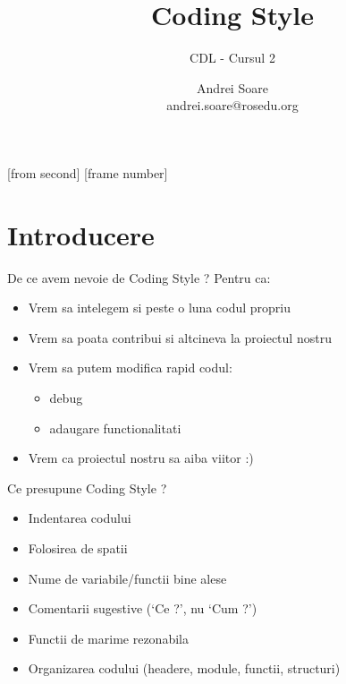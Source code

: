 \documentclass{beamer}
\title[Coding Style]{Coding Style}
\subtitle{CDL - Cursul 2}
\institute{ROSEdu}
\author{Andrei Soare \\ {\footnotesize andrei.soare@rosedu.org}}
\begin{document}
[from second]
[frame number]

\frame{\titlepage}

\frame{\tableofcontents}


\section{Introducere}

  \frame{\tableofcontents[currentsection]}

  \begin{frame}{De ce avem nevoie de Coding Style ?}
  Pentru ca:\\
  \vspace{0.8cm}
  \begin{itemize}
  \setlength{\itemsep}{0.3cm}
  \pause \item Vrem sa intelegem si peste o luna codul propriu
  \pause \item Vrem sa poata contribui si altcineva la proiectul nostru
  \pause \item Vrem sa putem modifica rapid codul:\begin{itemize} \item debug \item adaugare functionalitati \end{itemize}
  \pause \item Vrem ca proiectul nostru sa aiba viitor :)
  \end{itemize}
  \end{frame}

  \begin{frame}{Ce presupune Coding Style ?}
  \begin{itemize}
  \setlength{\itemsep}{0.3cm}
  \item Indentarea codului \pause
  \item Folosirea de spatii \pause
  \item Nume de variabile/functii bine alese \pause
  \item Comentarii sugestive ({\ttfamily `Ce ?'}, nu {\ttfamily `Cum ?'}) \pause
  \item Functii de marime rezonabila \pause
  \item Organizarea codului (headere, module, functii, structuri)
  \end{itemize}
  \end{frame}
\end{document}
